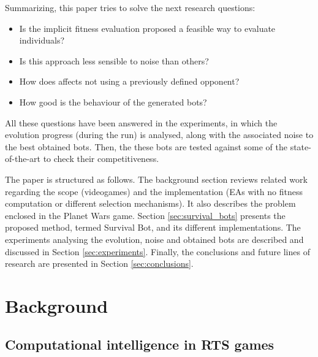 \documentclass[conference]{IEEEtran}
\begin{document}
Summarizing, this paper tries to solve the next research questions:
\begin{itemize}
\item Is the implicit fitness evaluation proposed a feasible way to evaluate individuals?
\item Is this approach less sensible to noise than others?
\item How does affects not using a previously defined opponent?
\item How good is the behaviour of the generated bots?
\end{itemize}

All these questions have been answered in the experiments, in which the evolution progress (during the run) is analysed, along with the associated noise to the best obtained bots. Then, the these bots are tested against some of the state-of-the-art to check their competitiveness.

The paper is structured as follows. The background section reviews related work regarding the scope (videogames) and the implementation (EAs with no fitness computation or different selection mechanisms). It also describes the problem enclosed in the Planet Wars game.
Section \ref{sec:survival_bots} presents the proposed method, termed {Survival Bot}, and its different implementations.
The experiments analysing the evolution, noise and obtained bots are described and discussed in Section \ref{sec:experiments}. Finally, the conclusions and future lines of research are presented in Section \ref{sec:conclusions}.



%
\section{Background}

\subsection{Computational intelligence in RTS games}
\label{subsec:soa}
\end{document}
